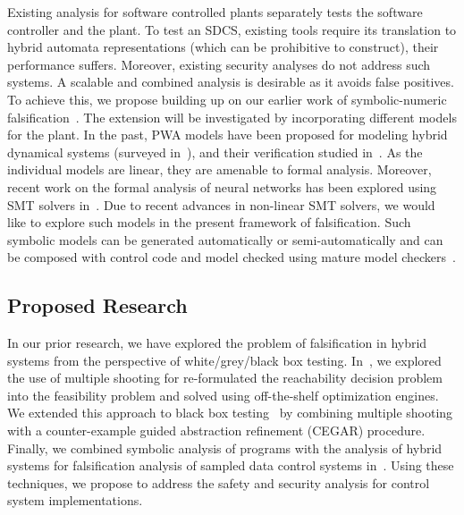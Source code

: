 Existing analysis for software controlled plants separately tests the
software controller and the plant. To test an SDCS, existing tools
require its translation to hybrid automata representations (which can
be prohibitive to construct), their performance suffers.  Moreover,
existing security analyses do not address such systems. A scalable and
combined analysis is desirable as it avoids false positives. To
achieve this, we propose building up on our earlier work of
symbolic-numeric falsification~\cite{zutshi2016symbolic}. The
extension will be investigated by incorporating different models for
the plant. In the past, PWA models have been proposed for modeling
hybrid dynamical systems (surveyed
in~\cite{paoletti2007identification}), and their verification studied
in~\cite{yordanov2007model, yordanov2010formal, koutsoukos2003safety,
batt2007model}. As the individual models are linear, they are amenable
to formal analysis.  Moreover, recent work on the formal analysis of
neural networks has been explored using SMT solvers
in~\cite{pulina2012challenging, pulina2011never, pulina2011checking,
katz2017reluplex}. Due to recent advances in non-linear SMT solvers,
we would like to explore such models in the present framework of
falsification. Such symbolic models can be generated automatically or
semi-automatically and can be composed with control code and model
checked using mature model checkers~\cite{kroening2014cbmc}.


\subsection{Proposed Research}

In our prior research, we have explored the problem of falsification
in hybrid systems from the perspective of white/grey/black box
testing. In~\cite{Zutshi+Others/2013/Trajectory}, we explored the use
of multiple shooting for re-formulated the reachability decision
problem into the feasibility problem and solved using off-the-shelf
optimization engines. We extended this approach to black box
testing~\cite{zutshi2014multiple} by combining multiple shooting with
a counter-example guided abstraction refinement (CEGAR) procedure.
Finally, we combined symbolic analysis of programs with the analysis
of hybrid systems for falsification analysis of sampled data control
systems in~\cite{zutshi2016symbolic}.
Using these techniques, we propose to address the safety and security
analysis for control system implementations.

